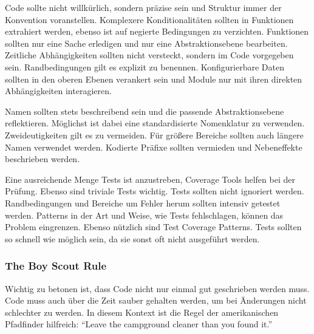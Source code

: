 Code sollte nicht willkürlich, sondern präzise sein und Struktur immer der Konvention voranstellen.
Komplexere Konditionalitäten sollten in Funktionen extrahiert werden, ebenso ist auf negierte Bedingungen zu verzichten.
Funktionen sollten nur eine Sache erledigen und nur eine Abstraktionsebene bearbeiten.
Zeitliche Abhängigkeiten sollten nicht versteckt, sondern im Code vorgegeben sein.
Randbedingungen gilt es explizit zu benennen.
Konfigurierbare Daten sollten in den oberen Ebenen verankert sein und Module nur mit ihren direkten Abhängigkeiten interagieren.

Namen sollten stets beschreibend sein und die passende Abstraktionsebene reflektieren.
Möglichst ist dabei eine standardisierte Nomenklatur zu verwenden.
Zweideutigkeiten gilt es zu vermeiden.
Für größere Bereiche sollten auch längere Namen verwendet werden.
Kodierte Präfixe sollten vermieden und Nebeneffekte beschrieben werden.

Eine ausreichende Menge Tests ist anzustreben, Coverage Tools helfen bei der Prüfung.
Ebenso sind triviale Tests wichtig.
Tests sollten nicht ignoriert werden.
Randbedingungen und Bereiche um Fehler herum sollten intensiv getestet werden.
Patterns in der Art und Weise, wie Tests fehlschlagen, können das Problem eingrenzen.
Ebenso nützlich sind Test Coverage Patterns.
Tests sollten so schnell wie möglich sein, da sie sonst oft nicht ausgeführt werden.

\subsubsection{The Boy Scout Rule}
Wichtig zu betonen ist, dass Code nicht nur einmal gut geschrieben werden muss.
Code muss auch über die Zeit sauber gehalten werden, um bei Änderungen nicht schlechter zu werden.
In diesem Kontext ist die Regel der amerikanischen Pfadfinder hilfreich:
\enquote{Leave the campground cleaner than you found it.}~\cite{clean-code}
